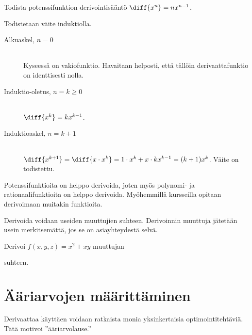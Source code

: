 \begin{esimerkki}
	Todista potenssifunktion derivointisääntö $\diff{x^n} = nx^{n-1}$.
	\begin{esimratk}
		Todistetaan väite induktiolla.
		\begin{description}
			\item[Alkuaskel, $n=0$] \hfill \\
			Kyseessä on vakiofunktio. Havaitaan helposti, että tällöin derivaattafunktio on identtisesti nolla.
			\item[Induktio-oletus, $n=k\geq0$] \hfill \\
			$\diff{x^k} = kx^{k-1}$.
			\item[Induktioaskel, $n=k+1$] \hfill \\
			$\diff{x^{k+1}} = \diff{x \cdot x^k} = 1 \cdot x^k + x \cdot kx^{k-1} = (k+1)x^k$. Väite on todistettu.
		\end{description}
	\end{esimratk}
\end{esimerkki}

Potenssifunktioita on helppo derivoida, joten myös polynomi- ja rationaalifunktioita on helppo derivoida.
Myöhemmillä kursseilla opitaan derivoimaan muitakin funktioita.

Derivoida voidaan useiden muuttujien suhteen. Derivoinnin muuttuja jätetään usein merkitsemättä, jos se on
asiayhteydestä selvä.

\begin{esimerkki}
	Derivoi $f(x,y,z)=x^2+xy$ muuttujan
	\begin{alakohdatrivi}
	\end{alakohdatrivi}
	suhteen. %
	\begin{esimvast}
		\begin{alakohdatrivi}
			\alakohta{$2x+y$}
			\alakohta{$x$}
			\alakohta{$0$}
		\end{alakohdatrivi}
	\end{esimvast}
\end{esimerkki}

\section{Ääriarvojen määrittäminen}

Derivaattaa käyttäen voidaan ratkaista monia yksinkertaisia optimointitehtäviä.
Tätä motivoi ''ääriarvolause.''

